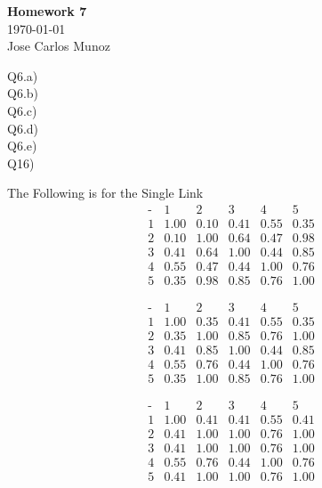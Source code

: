 \documentclass[12pt,english]{article}
\begin{document}
\begin{center}
    \Large
    \textbf{Homework 7}\\
    \small
    \today\\
    \large
    Jose Carlos Munoz
\end{center}%
Q6.a)\\
Q6.b)\\
Q6.c)\\
Q6.d)\\
Q6.e)\\
Q16)\par
The Following is for the Single Link\\
\begin{equation*}
\begin{array}{c|ccccc}
\mbox{-}& 1 & 2 & 3 & 4 & 5\\
\hline
1 & 1.00 & 0.10 & 0.41 & 0.55 & 0.35 \\
2 & 0.10 & 1.00 & 0.64 & 0.47 & 0.98 \\
3 & 0.41 & 0.64 & 1.00 & 0.44 & 0.85 \\
4 & 0.55 & 0.47 & 0.44 & 1.00 & 0.76 \\
5 & 0.35 & 0.98 & 0.85 & 0.76 & 1.00 
\end{array}
\end{equation*}

\begin{equation*}
\begin{array}{c|ccccc}
\mbox{-}& 1 & 2 & 3 & 4 & 5\\
\hline
1 & 1.00 & 0.35 & 0.41 & 0.55 & 0.35 \\
2 & 0.35 & 1.00 & 0.85 & 0.76 & 1.00 \\
3 & 0.41 & 0.85 & 1.00 & 0.44 & 0.85 \\
4 & 0.55 & 0.76 & 0.44 & 1.00 & 0.76 \\
5 & 0.35 & 1.00 & 0.85 & 0.76 & 1.00 
\end{array}
\end{equation*}

\begin{equation*}
\begin{array}{c|ccccc}
\mbox{-}& 1 & 2 & 3 & 4 & 5\\
\hline
1 & 1.00 & 0.41 & 0.41 & 0.55 & 0.41 \\
2 & 0.41 & 1.00 & 1.00 & 0.76 & 1.00 \\
3 & 0.41 & 1.00 & 1.00 & 0.76 & 1.00 \\
4 & 0.55 & 0.76 & 0.44 & 1.00 & 0.76 \\
5 & 0.41 & 1.00 & 1.00 & 0.76 & 1.00 
\end{array}
\end{equation*}
\end{document}
